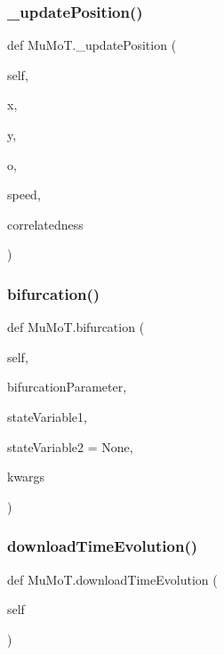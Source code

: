 \mbox{\label{namespace_mu_mo_t_abd85de494ba030d07854207487bfdfca}} 
\subsubsection{\texorpdfstring{\+\_\+update\+Position()}{\_updatePosition()}}
{\footnotesize\ttfamily def Mu\+Mo\+T.\+\_\+update\+Position (\begin{DoxyParamCaption}\item[{}]{self,  }\item[{}]{x,  }\item[{}]{y,  }\item[{}]{o,  }\item[{}]{speed,  }\item[{}]{correlatedness }\end{DoxyParamCaption})\hspace{0.3cm}{\ttfamily [private]}}

\mbox{\label{namespace_mu_mo_t_ae466ad8ef36436d24ce26c73e79bf20c}} 
\subsubsection{\texorpdfstring{bifurcation()}{bifurcation()}}
{\footnotesize\ttfamily def Mu\+Mo\+T.\+bifurcation (\begin{DoxyParamCaption}\item[{}]{self,  }\item[{}]{bifurcation\+Parameter,  }\item[{}]{state\+Variable1,  }\item[{}]{state\+Variable2 = {\ttfamily None},  }\item[{}]{kwargs }\end{DoxyParamCaption})}

\mbox{\label{namespace_mu_mo_t_a767fc349799c43e81b8b7c79b9822d03}} 
\subsubsection{\texorpdfstring{download\+Time\+Evolution()}{downloadTimeEvolution()}}
{\footnotesize\ttfamily def Mu\+Mo\+T.\+download\+Time\+Evolution (\begin{DoxyParamCaption}\item[{}]{self }\end{DoxyParamCaption})}

